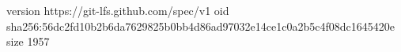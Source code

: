 version https://git-lfs.github.com/spec/v1
oid sha256:56dc2fd10b2b6da7629825b0bb4d86ad97032e14ce1c0a2b5c4f08dc1645420e
size 1957
